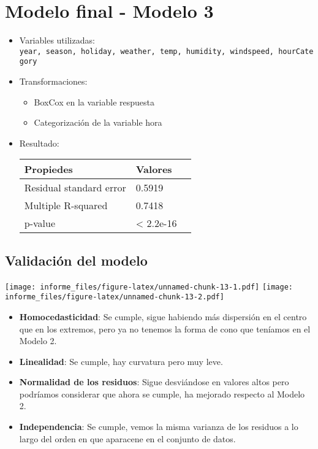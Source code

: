 \documentclass[
]{article}
\providecommand{\tightlist}{%
  \setlength{\itemsep}{0pt}\setlength{\parskip}{0pt}}
\begin{document}
\hypertarget{modelo-final---modelo-3}{%
\section{Modelo final - Modelo 3}\label{modelo-final---modelo-3}}

\begin{itemize}
\item
  Variables utilizadas:
  \texttt{year,\ season,\ holiday,\ weather,\ temp,\ humidity,\ windspeed,\ hourCategory}
\item
  Transformaciones:

  \begin{itemize}
  \tightlist
  \item
    BoxCox en la variable respuesta
  \item
    Categorización de la variable hora
  \end{itemize}
\item
  Resultado:

  \begin{longtable}[]{@{}lll@{}}
  \toprule
  Propiedes & Valores &\tabularnewline
  \midrule
  \endhead
  Residual standard error & 0.5919 &\tabularnewline
  Multiple R-squared & 0.7418 &\tabularnewline
  p-value & \textless{} 2.2e-16 &\tabularnewline
  \bottomrule
  \end{longtable}
\end{itemize}

\hypertarget{validaciuxf3n-del-modelo}{%
\subsection{Validación del modelo}\label{validaciuxf3n-del-modelo}}

\texttt{[image: informe\_files/figure-latex/unnamed-chunk-13-1.pdf]}
\texttt{[image: informe\_files/figure-latex/unnamed-chunk-13-2.pdf]}

\begin{itemize}
\tightlist
\item
  \textbf{Homocedasticidad}: Se cumple, sigue habiendo más dispersión en
  el centro que en los extremos, pero ya no tenemos la forma de cono que
  teníamos en el Modelo 2.
\item
  \textbf{Linealidad}: Se cumple, hay curvatura pero muy leve.
\item
  \textbf{Normalidad de los residuos}: Sigue desviándose en valores
  altos pero podríamos considerar que ahora se cumple, ha mejorado
  respecto al Modelo 2.
\item
  \textbf{Independencia}: Se cumple, vemos la misma varianza de los
  residuos a lo largo del orden en que aparacene en el conjunto de
  datos.
\end{itemize}
\end{document}
